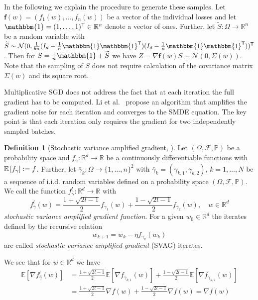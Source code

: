 \documentclass[12pt]{article}
\theoremstyle{definition}
\newtheorem{definition}[definition]{Definition}
\numberwithin{equation}{section}
\newcommand{\R}{\mathbb{R}}
\newcommand{\BP}{\mathbb{P}}
\newcommand{\CF}{\mathcal{F}}
\newcommand{\CN}{\mathcal{N}}
\newcommand{\T}{\mathsf{T}}
\newcommand{\ev}[1]{\mathbb{E}\left[{#1}\right]}
\newcommand{\defeq}{\vcentcolon=}
\begin{document}
In the following we explain the procedure to generate these samples.
Let $\pmb{f}(w) = (f_1(w), \dots, f_n(w))$ be a vector of the individual losses and let $\mathbbm{1} = (1, \dots, 1)^\T \in \R^n$ denote a vector of ones. Further, let $\widetilde{S} : \Omega \rightarrow \R^n$ be a random variable  with $\widetilde{S} \sim \CN(0, \frac{1}{bn}(I_d - \frac{1}{n}\mathbbm{1}\mathbbm{1}^\T )(I_d - \frac{1}{n}\mathbbm{1}\mathbbm{1}^\T))^\T$. Then for $S = \frac{1}{n} \mathbbm{1} + \widetilde{S}$ we have $Z = \nabla \pmb{f}(w)S \sim \CN(0, \Sigma(w))$.
Note that the sampling of $S$ does not require calculation of the covariance matrix $\Sigma(w)$ and its square root.

Multiplicative SGD does not address the fact that at each iteration the full gradient has to be computed. Li et al.\ \cite{liValidityModelingSGD2021} propose an algorithm that amplifies the gradient noise for each iteration and converges to the SMDE equation. The key point is that each iteration only requires the gradient for two independently sampled batches. 
\begin{definition}[Stochastic variance amplified gradient, \cite{liValidityModelingSGD2021}]
  Let $(\Omega, \CF, \BP)$ be a probability space and $f_{\gamma} : \R^d \rightarrow \R$ be a continuously differentiable functions with $\ev{f_{\gamma}} \defeq f$. Further, let $\bar{\gamma}_k : \Omega \rightarrow \{1,\dots,n\}^2 $ with $\bar{\gamma}_k =(\gamma_{k,1}, \gamma_{k,2})$, $k=1,\dots,N$ be a sequence of i.i.d. random variables defined on a probability space $(\Omega, \CF, \BP)$. We call the function $f^l_{\bar{\gamma}} : \R^d \rightarrow \R$ with
  \begin{equation*}
    f^l_{\bar{\gamma}}(w) =  \frac{1+\sqrt{2l - 1}}{2}f_{\gamma_{1}}(w) + \frac{1-\sqrt{2l - 1}}{2}f_{\gamma_{2}}(w), \quad w \in \R^d
  \end{equation*}
  \emph{stochastic variance amplified gradient function}.
    For a given $w_{0} \in \R^d$ the iterates defined by the recursive relation
  \begin{equation*}
    w_{k+1} = w_{k} - \eta f_{\bar{\gamma_k}}(w_{k})
  \end{equation*}
  are called \emph{stochastic variance amplified gradient} (SVAG) iterates.
\end{definition}
We see that for $w \in \R^d$ we have
\begin{align*}
  \ev{\nabla f^l_{\bar{\gamma}}(w)} &= \frac{1+\sqrt{2l - 1}}{2}\ev{\nabla f_{\gamma_{k,1}}(w)} + \frac{1-\sqrt{2l - 1}}{2}\ev{\nabla f_{\gamma_{k,2}}(w)} \\
  &= \frac{1+\sqrt{2l - 1}}{2}\nabla f(w) + \frac{1-\sqrt{2l - 1}}{2} \nabla f(w) = \nabla f(w)
\end{align*}
\end{document}
